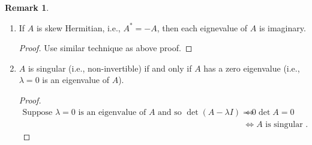 \documentclass[12pt]{article}
\newcommand{\overbar}[1]{\mkern 1.5mu\overline{\mkern-1.5mu#1\mkern-1.5mu}\mkern 1.5mu}
\theoremstyle{definition}
\newtheorem*{corollary}{Corollary}
\newtheorem*{remark}{Remark}
\begin{document}
\begin{remark}
\begin{enumerate}[label = (\alph*)]
\begin{proof}
Let $\lambda$ be an eigenvalue of $A$. Then there exists a vector $v \neq 0$ such that
$Av = \lambda v$. Subtracting $\lambda v$ from both sides and taking the conjugate
transpose then we have $(Av)^* = (\lambda v)^*$. By properties of the conjugate transpose,
then $v^* \cdot A^* = \overbar{\lambda} \cdot v^*$. Since $A$ is hermitian, then
$A^* = A$. Therefore $v^* A = \overbar{\lambda} \cdot v^*$. Right multiplying both
sides by $v$ we have $v^* (Av) = \overbar{\lambda} \cdot v^* \cdot v$ and then because
$\lambda$ is an eigenvalue of $A$ we can replace $Av$ with $\lambda v$, 
$v^* ( \lambda \cdot v ) = \overbar{\lambda} \cdot v^* \cdot v$. Then moving the scalar
$\lambda$ to the left side we have $\lambda \cdot (v^* \cdot v) = \overbar{\lambda} (v^* \cdot v)$.
Because $v$ is an eigenvector we know $v \neq 0$ and so $v^* \cdot v = \langle v, v \rangle > 0$.
Therefore, it must be the case that $\lambda = \overbar{\lambda}$. Now let $\lambda = a + bi$.
Then $\lambda = \overbar{\lambda}$ implies that $a + bi = a - bi$ and so $bi = -bi$, and
therefore, $b = -b$. Since $b \in \mathbb{R}$, then this means that $b = 0$. Thus, 
$\lambda = a \in \mathbb{R}$.
\end{proof}

\begin{corollary}
If $A$ is a real symmetric matrix, i.e., $A = A^T \in \mathbb{R}^{n \times n}$, then each
eigenvalue of $A$ is real.
\end{corollary}


\item If $A$ is skew Hermitian, i.e., $A^* = -A$, then each eignevalue of $A$ is imaginary.

\begin{proof} Use similar technique as above proof.
\end{proof}

\item $A$ is singular (i.e., non-invertible) if and only if $A$ has a zero eigenvalue (i.e.,
$\lambda = 0$ is an eigenvalue of $A$).

\begin{proof}
\begin{align*}
\text{Suppose } \lambda = 0 \text{ is an eigenvalue of } A \text{ and so } \det(A - \lambda I) = 0 &\iff
\det A = 0 \\
&\iff A \text{ is singular }. 
\end{align*}
\end{proof}
\end{enumerate}
\end{remark}
\end{document}
